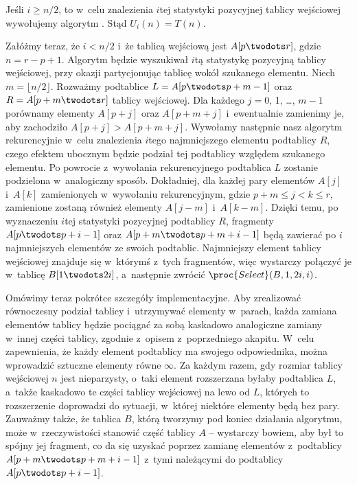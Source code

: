 
\subproblem %

\noindent Jeśli $i\ge n/2$, to w~celu znalezienia $i$\nbhyphen tej statystyki pozycyjnej tablicy wejściowej wywołujemy algorytm .
Stąd $U_i(n)=T(n)$.

Załóżmy teraz, że $i<n/2$ i~że tablicą wejściową jest $A[p\twodots r]$, gdzie $n=r-p+1$.
Algorytm będzie wyszukiwał $i$\nbhyphen tą statystykę pozycyjną tablicy wejściowej, przy okazji partycjonując tablicę wokół szukanego elementu.
Niech $m=\lfloor n/2\rfloor$.
Rozważmy podtablice $L=A[p\twodots p+m-1]$ oraz $R=A[p+m\twodots r]$ tablicy wejściowej.
Dla każdego $j=0$, 1, \dots, $m-1$ porównamy elementy $A[p+j]$ oraz $A[p+m+j]$ i~ewentualnie zamienimy je, aby zachodziło $A[p+j]>A[p+m+j]$.
Wywołamy następnie nasz algorytm rekurencyjnie w~celu znalezienia $i$\nbhyphen tego najmniejszego elementu podtablicy $R$, czego efektem ubocznym będzie podział tej podtablicy względem szukanego elementu.
Po powrocie z~wywołania rekurencyjnego podtablica $L$ zostanie podzielona w~analogiczny sposób.
Dokładniej, dla każdej pary elementów $A[j]$ i~$A[k]$ zamienionych w~wywołaniu rekurencyjnym, gdzie $p+m\le j<k\le r$, zamienione zostaną również elementy $A[j-m]$ i~$A[k-m]$.
Dzięki temu, po wyznaczeniu $i$\nbhyphen tej statystyki pozycyjnej podtablicy $R$, fragmenty $A[p\twodots p+i-1]$ oraz $A[p+m\twodots p+m+i-1]$ będą zawierać po $i$ najmniejszych elementów ze swoich podtablic.
Najmniejszy element tablicy wejściowej znajduje się w~którymś z~tych fragmentów, więc wystarczy połączyć je w~tablicę $B[1\twodots2i]$, a~następnie zwrócić $\proc{Select}(B,1,2i,i)$.

Omówimy teraz pokrótce szczegóły implementacyjne.
Aby zrealizować równoczesny podział tablicy i~utrzymywać elementy w~parach, każda zamiana elementów tablicy będzie pociągać za sobą kaskadowo analogiczne zamiany w~innej części tablicy, zgodnie z~opisem z~poprzedniego akapitu.
W~celu zapewnienia, że każdy element podtablicy ma swojego odpowiednika, można wprowadzić sztuczne elementy równe $\infty$.
Za każdym razem, gdy rozmiar tablicy wejściowej $n$ jest nieparzysty, o~taki element rozszerzana byłaby podtablica $L$, a~także kaskadowo te części tablicy wejściowej na lewo od $L$, których to rozszerzenie doprowadzi do sytuacji, w~której niektóre elementy będą bez pary.
Zauważmy także, że tablica $B$, którą tworzymy pod koniec działania algorytmu, może w~rzeczywistości stanowić część tablicy $A$ -- wystarczy bowiem, aby był to spójny jej fragment, co da się uzyskać poprzez zamianę elementów z~podtablicy $A[p+m\twodots p+m+i-1]$ z~tymi należącymi do podtablicy $A[p\twodots p+i-1]$.

